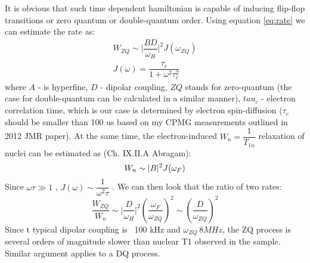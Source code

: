 \documentclass[a4paper, 12pt]{article}
\begin{document}
It is obvious that such time dependent hamiltonian is capable of inducing flip-flop transitions or zero quantum or double-quantum order. Using equation \ref{eq:rate} we can estimate the rate as:
\begin{equation}
\begin{array}{cc}
W_{ZQ}  \sim \vert \dfrac{B D}{\omega_H} \vert ^2 J(\omega_{ZQ}) \\
J(\omega) = \dfrac{\tau_c}{1+\omega^2\tau_c^2}
\end{array}
\end{equation}
where $A$ - is hyperfine, $D$ - dipolar coupling, $ZQ$ stands for zero-quantum (the case for double-quantum can be calculated in a similar manner), $tau_c$ - electron correlation time, which is our case is determined by electron spin-diffusion ($\tau_c$ should be smaller than 100 us based on my CPMG measurements outlined in 2012 JMR paper). At the same time, the electron-induced $W_n = \dfrac{1}{T_{1n}}$ relaxation of nuclei can be estimated as (Ch. IX.II.A Abragam):
\begin{equation}
W_{n}  \sim \vert B \vert ^2 J(\omega_F) \\
\end{equation}
Since $\omega \tau \gg 1$ ,  $J(\omega) \sim \dfrac{1}{\omega^2 \tau}$ . We can then look that the ratio of two rates:
\begin{equation}
\dfrac{W_{ZQ}}{W_n} \sim \vert \dfrac{D}{\omega_H} \vert^2 (\dfrac{\omega_F}{\omega_{ZQ}})^2 \sim (\dfrac{D}{\omega_{ZQ}})^2
\end{equation}
Since t typical dipolar coupling is ~100 kHz and $\omega_{ZQ} ~ 8 MHz$, the ZQ process is several orders of magnitude slower than nuclear T1 observed in the sample. Similar argument applies to a DQ process. 
\end{document}
